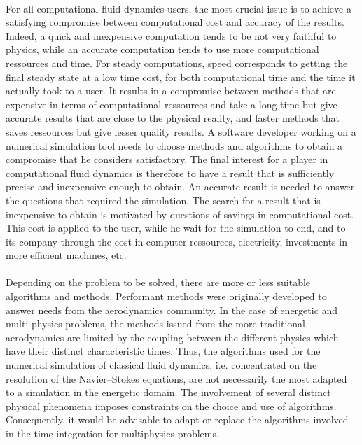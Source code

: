     \paragraph{}
    For all computational fluid dynamics users, the most crucial issue is to achieve a satisfying compromise between computational cost and accuracy of the results.
    Indeed, a quick and inexpensive computation tends to be not very faithful to physics, while an accurate computation tends to use more computational ressources and time.
    For steady computations, speed corresponds to getting the final steady state at a low time cost, for both computational time and the time it actually took to a user.
    It results in a compromise between methods that are expensive in terms of computational ressources and take a long time but give accurate results that are close to the physical reality, and faster methods that saves ressources but give lesser quality results.
    A software developer working on a numerical simulation tool needs to choose methods and algorithms to obtain a compromise that he considers satisfactory.
    The final interest for a player in computational fluid dynamics is therefore to have a result that is sufficiently precise and inexpensive enough to obtain.
    An accurate result is needed to answer the questions that required the simulation.
    The search for a result that is inexpensive to obtain is motivated by questions of savings in computational cost.
    This cost is applied to the user, while he wait for the simulation to end, and to its company through the cost in computer ressources, electricity, investments in more efficient machines, etc.

    \paragraph{}
    Depending on the problem to be solved, there are more or less suitable algorithms and methods.
    Performant methods were originally developed to answer needs from the aerodynamics community.
    In the case of energetic and multi-physics problems, the methods issued from the more traditional aerodynamics are limited by the coupling  between the different physics which have their distinct characteristic times.
    Thus, the algorithms used for the numerical simulation of classical fluid dynamics, i.e. concentrated on the resolution of the Navier--Stokes equations, are not necessarily the most adapted to a simulation in the energetic domain.
    The involvement of several distinct physical phenomena imposes constraints on the choice and use of algorithms.
    Consequently, it would be advisable to adapt or replace the algorithms involved in the time integration for multiphysics problems.

